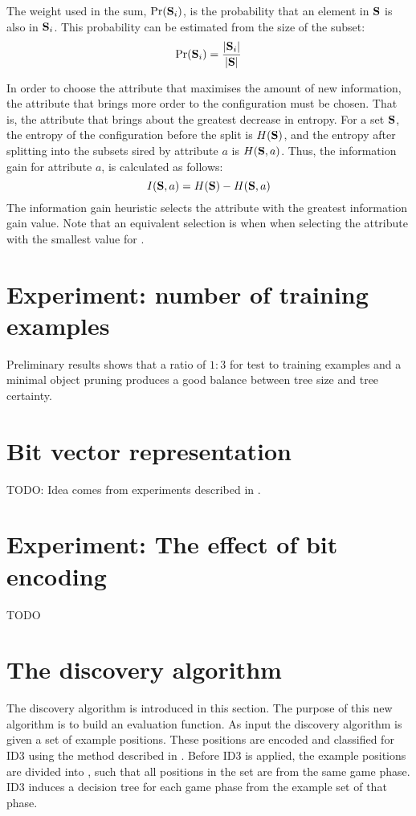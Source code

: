 The weight used in the sum, $\mbox{Pr}({\bf S}_i)$, is the probability that an element in ${\bf S}$ is also in ${\bf S}_i$.  This probability can be estimated from the size of the subset:
\begin{equation}
\mbox{Pr}({\bf S}_i) = \frac{|{\bf S}_i|}{|{\bf S}|}
\label{eq:subset_probability}
\end{equation}

In order to choose the attribute that maximises the amount of new information, the attribute that brings more order to the configuration must be chosen.  That is, the attribute that brings about the greatest decrease in entropy. For a set ${\bf S}$, the entropy of the configuration before the split is $H({\bf S})$, and the entropy after splitting into the subsets sired by attribute $a$ is $H({\bf S},a)$. Thus, the information gain for attribute $a$, is calculated as follows:
\begin{equation}
I({\bf S},a) = H({\bf S}) - H({\bf S},a)
\label{eq:gain}
\end{equation}
The information gain heuristic selects the attribute with the greatest information gain value. Note that an equivalent selection is when when selecting the attribute with the smallest value for . 

\section{Experiment: number of training examples}
Preliminary results shows that a ratio of $1:3$ for test to training examples and a minimal object pruning produces a good balance between tree size and tree certainty.

\section{Bit vector representation}
TODO: Idea comes from experiments described in \cite{shavlik:comparision}.  
\section{Experiment: The effect of bit encoding}
TODO

\section{The discovery algorithm}
\label{sec:discovery_algorithm}
The discovery algorithm is introduced in this section.  The purpose of this new algorithm is to build an evaluation function. As input the discovery algorithm is given a set of example positions. These positions are encoded and classified for ID3 using the method described in .
Before ID3 is applied, the example positions are divided into , such that all positions in the set are from the same game phase.  ID3 induces a decision tree for each game phase from the example set of that phase.   

